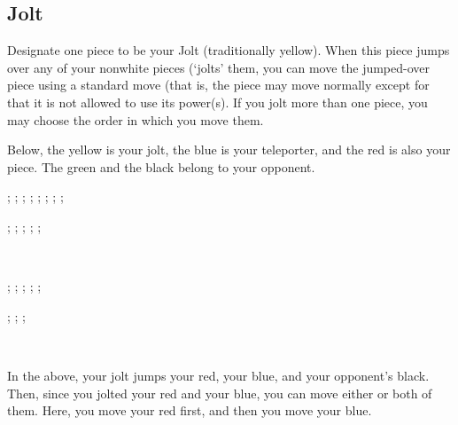 \documentclass[rulebook.tex]{subfiles}
\begin{document}
\subsection*{Jolt}

Designate one piece to be your Jolt (traditionally yellow).
When this piece jumps over any of your nonwhite pieces (`jolts' them,
you can move the jumped-over piece using a standard move
(that is, the piece may move normally except for that it is not
allowed to use its power(s). If you jolt more than one piece,
you may choose the order in which you move them.

Below, the yellow is your jolt, the blue is your teleporter,
and the red is also your piece.
The green and the black belong to your opponent.

\begin{center}
  \begin{struggleboard}
    ;
    ;
    ;
    ;
    ;
    ;
    ;
    ;
  \end{struggleboard}
  \begin{struggleboard}
    ;
    ;
    ;
    ;
    ;
  \end{struggleboard}
\end{center}
\
\begin{center}
  \begin{struggleboard}
    ;
    ;
    ;
    ;
    ;
  \end{struggleboard}
  \begin{struggleboard}
    ;
    ;
    ;
  \end{struggleboard}
\end{center}

\

In the above, your jolt jumps your red, your blue,
and your opponent's black. Then, since you jolted your
red and your blue, you can move either or both of them.
Here, you move your red first, and then you move your blue.
\end{document}
